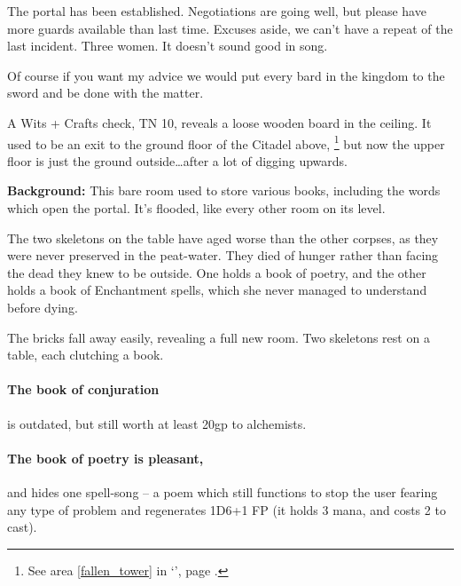 \begin{exampletext}

  The portal has been established.  Negotiations are going well, but please have more guards available than last time.  Excuses aside, we can't have a repeat of the last incident.  Three women.  It doesn't sound good in song.

  Of course if you want my advice we would put every bard in the kingdom to the sword and be done with the matter.

\end{exampletext}

A Wits + Crafts check, TN 10, reveals a loose wooden board in the ceiling.
It used to be an exit to the ground floor of the Citadel above,%
\footnote{See area \ref{fallen_tower} in `', page \pageref{fallen_tower}.}
but now the upper floor is just the ground outside\ldots after a lot of digging upwards.


\textbf{Background:}
This bare room used to store various books, including the words which open the portal.
It's flooded, like every other room on its level.

The two skeletons on the table have aged worse than the other corpses, as they were never preserved in the peat-water.
They died of hunger rather than facing the dead they knew to be outside.
One holds a book of poetry, and the other holds a book of Enchantment spells, which she never managed to understand before dying.

\begin{boxtext}

  The bricks fall away easily, revealing a full new room.  Two skeletons rest on a table, each clutching a book.

\end{boxtext}

\paragraph{The book of conjuration}
is outdated, but still worth at least 20gp to \gls{alchemists}.

\paragraph{The book of poetry is pleasant,}
and hides one spell-song -- a poem which still functions to stop the user fearing any type of problem and regenerates 1D6+1 FP (it holds 3 mana, and costs 2 to cast).

